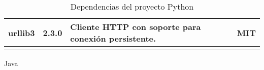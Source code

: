 \begin{longtable}[]{@{}llll@{}}
    \begin{minipage}[t]{0.18\columnwidth}\raggedright\strut urllib3 \strut \end{minipage} & \begin{minipage}[t]{0.10\columnwidth}\raggedright\strut 2.3.0 \strut \end{minipage} & \begin{minipage}[t]{0.49\columnwidth}\raggedright\strut Cliente HTTP con soporte para conexión persistente. \strut \end{minipage} & \begin{minipage}[t]{0.11\columnwidth}\raggedright\strut MIT \strut \end{minipage} \tabularnewline

    \bottomrule
    \caption{Dependencias del proyecto Python}
\end{longtable}


Java

